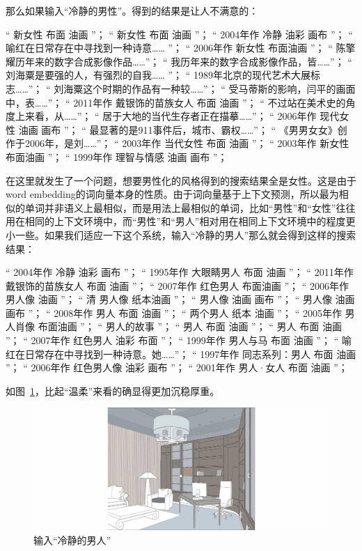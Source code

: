 那么如果输入“冷静的男性”。得到的结果是让人不满意的：

\footnotesize“ 新女性 布面 油画 ”；
“ 新女性 布面 油画 ”；
“ 2004年作 冷静 油彩 画布 ”；
“ 喻红在日常存在中寻找到一种诗意…… ”；
“ 2006年作 新女性 布面油画 ”；
“ 陈擎耀历年来的数字合成影像作品……”；
“ 我历年来的数字合成影像作品，皆……”；
“ 刘海粟是要强的人，有强烈的自我…… ”；
“ 1989年北京的现代艺术大展标志……”；
“ 刘海粟这个时期的作品有一种较……”；
“ 受马蒂斯的影响，闫平的画面中，表……”；
“ 2011年作 戴银饰的苗族女人 布面 油画 ”；
“ 不过站在美术史的角度上来看，从……”；
“ 居于大地的当代生存者正在描摹……”；
“ 2006年作 现代女性 油画 画布 ”；
“ 最显著的是911事件后，城市、霸权……”；
“ 《男男女女》创作于2006年，是刘……”；
“ 2003年作 当代女性 布面 油画 ”；
“ 2003年作 新女性 布面油画 ”；
“ 1999年作 理智与情感 油画 画布 ”；

\normalsize
在这里就发生了一个问题，想要男性化的风格得到的搜索结果全是女性。这是由于word embedding的词向量本身的性质。由于词向量基于上下文预测，所以最为相似的单词并非语义上最相似，而是用法上最相似的单词，比如“男性”和“女性”往往用在相同的上下文环境中，而“男性”和“男人”相对用在相同上下文环境中的程度更小一些。如果我们适应一下这个系统，输入“冷静的男人”那么就会得到这样的搜索结果：

\footnotesize
“ 2004年作 冷静 油彩 画布 ”；
“ 1995年作 大眼睛男人 布面 油画 ”；
“ 2011年作 戴银饰的苗族女人 布面 油画 ”；
“ 2007年作 红色男人 布面油画 ”；
“ 2006年作 男人像 油画 ”；
“ 清 男人像 纸本油画 ”；
“ 男人像 油画 画布 ”；
“ 男人像 油画 画布 ”；
“ 2008年作 男人 布面 油画 ”；
“ 两个男人 纸本 油画 ”；
“ 2005年作 男人肖像 布面油画 ”；
“ 男人的故事 ”；
“ 男人 布面 油画 ”；
“ 男人 布面 油画 ”；
“ 2007年作 红色男人 油彩 布面 ”；
“ 1999年作 男人与马 布面 油画 ”；
“ 喻红在日常存在中寻找到一种诗意。她……”；
“ 1997年作 同志系列：男人 布面 油画 ”；
“ 2006年作 红色男人像 油彩 画布 ”；
“ 2001年作 男人·女人 布面 油画 ”；
\normalsize

如图~\ref{figure:冷静的男人}，比起“温柔”来看的确显得更加沉稳厚重。

\begin{figure}[!htbp]
\centering
\includegraphics[width=\linewidth,keepaspectratio]{data/chapter-4/冷静的男性}
\caption{输入“冷静的男人”}
\label{figure:冷静的男人}
\end{figure}

